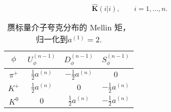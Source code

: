 \documentclass{article}
\begin{document}

\begin{equation}
\widehat{\mathbf{K}}(i|i),\qquad i=1,\dots,n.
\end{equation}


\begin{table}[H]
    \begin{tabular}{|c|c|c|c|}
    \hline 
    $\phi$ & $U_{\phi}^{\left(n-1\right)}$ & $D_{\phi}^{\left(n-1\right)}$ & $S_{\phi}^{\left(n-1\right)}$\tabularnewline
    \hline 
    \hline 
    $\pi^{+}$ & $\frac{1}{2}a^{\left(n\right)}$ & $-\frac{1}{2}a^{\left(n\right)}$ & $0$\tabularnewline
    \hline 
    $K^{+}$ & $\frac{1}{2}a^{\left(n\right)}$ & $0$ & $-\frac{1}{2}a^{\left(n\right)}$\tabularnewline
    \hline 
    $K^{0}$ & $0$ & $\frac{1}{2}a^{\left(n\right)}$ & $-\frac{1}{2}a^{\left(n\right)}$\tabularnewline
    \hline 
    \end{tabular}
    
    \caption{赝标量介子夸克分布的 Mellin 矩，归一化到$a^{\left(1\right)}=2$.\label{tab:yu_tab_1}}
    
    \end{table}
\end{document}
